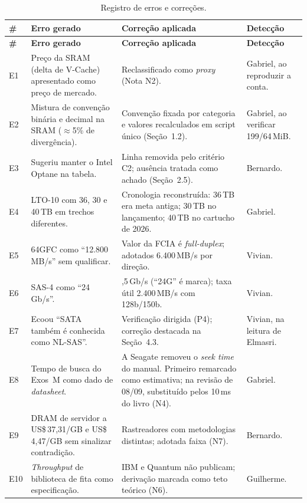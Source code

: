 \documentclass[11pt,a4paper]{article}
\begin{document}
{\small
\setlength{\tabcolsep}{4pt}
\begin{longtable}{@{}p{0.7cm}>{\RaggedRight\arraybackslash}p{5.5cm}>{\RaggedRight\arraybackslash}p{5.6cm}>{\RaggedRight\arraybackslash}p{2.8cm}@{}}
\caption{Registro de erros e correções.}\label{tab:erros}\\
\toprule
\textbf{\#} & \textbf{Erro gerado} & \textbf{Correção aplicada} & \textbf{Detecção} \\
\midrule
\endfirsthead
\toprule
\textbf{\#} & \textbf{Erro gerado} & \textbf{Correção aplicada} & \textbf{Detecção} \\
\midrule
\endhead
\bottomrule
\endfoot
E1 & Preço da SRAM (delta de V-Cache) apresentado como preço de mercado. & Reclassificado como \emph{proxy} (Nota N2). & Gabriel, ao reproduzir a conta. \\
E2 & Mistura de convenção binária e decimal na SRAM ($\approx$5\% de divergência). & Convenção fixada por categoria e valores recalculados em script único (Seção~1.2). & Gabriel, ao verificar 199/64\,MiB. \\
E3 & Sugeriu manter o Intel Optane na tabela. & Linha removida pelo critério C2; ausência tratada como achado (Seção~2.5). & Bernardo. \\
E4 & LTO-10 com 36, 30 e 40\,TB em trechos diferentes. & Cronologia reconstruída: 36\,TB era meta antiga; 30\,TB no lançamento; 40\,TB no cartucho de 2026. & Gabriel. \\
E5 & 64GFC como ``12.800\,MB/s'' sem qualificar. & Valor da FCIA é \emph{full-duplex}; adotados 6.400\,MB/s por direção. & Vivian. \\
E6 & SAS-4 como ``24\,Gb/s''. & 22,5\,Gb/s (``24G'' é marca); taxa útil 2.400\,MB/s com 128b/150b. & Vivian. \\
E7 & Ecoou ``SATA também é conhecida como NL-SAS''. & Verificação dirigida (P4); correção destacada na Seção~4.3. & Vivian, na leitura de Elmasri. \\
E8 & Tempo de busca do Exos~M como dado de \emph{datasheet}. & A Seagate removeu o \emph{seek time} do manual. Primeiro remarcado como estimativa; na revisão de 08/09, substituído pelos 10\,ms do livro (N4). & Gabriel. \\
E9 & DRAM de servidor a US\$\,37,31/GB e US\$\,4,47/GB sem sinalizar contradição. & Rastreadores com metodologias distintas; adotada faixa (N7). & Bernardo. \\
E10 & \emph{Throughput} de biblioteca de fita como especificação. & IBM e Quantum não publicam; derivação marcada como teto teórico (N6). & Guilherme. \\

\end{longtable}}
\end{document}
